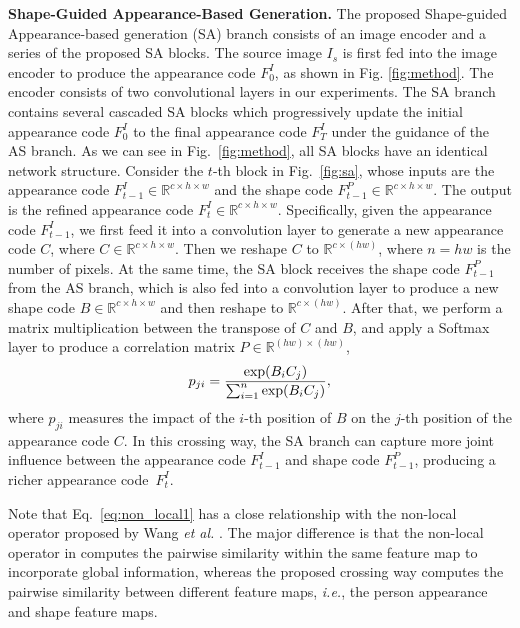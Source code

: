 \documentclass[runningheads]{llncs}
\begin{document}
\noindent \textbf{Shape-Guided Appearance-Based Generation.}
The proposed Shape-guided Appearance-based generation (SA) branch consists of an image encoder and a series of the proposed SA blocks.
The source image $I_s$ is first fed into the image encoder to produce the appearance code $F_0^I$, as shown in Fig. \ref{fig:method}.
The encoder consists of two convolutional layers in our experiments. 
The SA branch contains several cascaded SA blocks which progressively update the initial appearance code $F_0^I$ to the final appearance code $F_T^I$ under the guidance of the AS branch. 
As we can see in Fig.~\ref{fig:method}, all SA blocks have an identical network structure.
Consider the $t$-th block in Fig.~\ref{fig:sa}, whose inputs are the appearance code $F_{t-1}^I {\in} \mathbb{R}^{c \times h \times w}$ and the shape code $F_{t-1}^P {\in} \mathbb{R}^{c \times h \times w}$. The output is the refined appearance code $F_t^I {\in} \mathbb{R}^{c \times h \times w}$.
Specifically, given the appearance code $F_{t-1}^I$, we first feed it into a convolution layer to generate a new appearance code $C$, where $C {\in} \mathbb{R}^{c \times h \times w}$. 
Then we reshape $C$ to $\mathbb{R}^{c \times (hw)}$, where $n {=} hw$ is the number of pixels.
At the same time, the SA block receives the shape code $F_{t-1}^P$ from the AS branch, which is also fed into a convolution layer to produce a new shape code $B {\in} \mathbb{R}^{c \times h \times w}$ and then reshape to $\mathbb{R}^{c \times (hw)}$.
After that, we perform a matrix multiplication between the transpose of $C$ and $B$, and apply a Softmax layer to produce a correlation matrix $P {\in} \mathbb{R}^{(hw) \times (hw)}$,
\begin{equation}
\begin{aligned}
p_{ji} = \frac{{\rm exp} ( B_i  C_j)}{\sum_{i=1}^n {\rm exp}( B_i C_j)},
\label{eq:non_local1}
\end{aligned}
\end{equation}
where $p_{ji}$ measures the impact of the $i$-th position of $B$ on the $j$-th position of the appearance code $C$.
In this crossing way, the SA branch can capture more joint influence between the appearance code $F_{t-1}^I$ and shape code $F_{t-1}^P$, producing a richer appearance code~$F_{t}^I$.

Note that Eq.~\eqref{eq:non_local1} has a close relationship with the non-local operator proposed by Wang \emph{et al.} \cite{wang2018non}. 
The major difference is that the non-local operator in \cite{wang2018non} computes the pairwise similarity within the same feature map to incorporate global information, whereas the proposed crossing way computes the pairwise similarity between different feature maps, \emph{i.e.}, the person appearance and shape feature maps.
\end{document}
